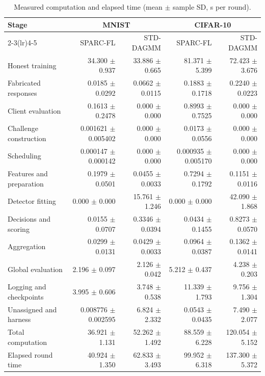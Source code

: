 \begin{table}[t]\centering\footnotesize\setlength{\tabcolsep}{5pt}
\caption{Measured computation and elapsed time (mean $\pm$ sample SD, s per round).}\label{tab:std-segments}
\begin{tabular}{lrrrr}\toprule
\multirow{2}{*}{Stage} & \multicolumn{2}{c}{MNIST} & \multicolumn{2}{c}{CIFAR-10} \\
\cmidrule(lr){2-3}\cmidrule(lr){4-5}
 & SPARC-FL & STD-DAGMM & SPARC-FL & STD-DAGMM \\ \midrule
Honest training & 34.300 $\pm$ 0.937 & 33.886 $\pm$ 0.665 & 81.371 $\pm$ 5.399 & 72.423 $\pm$ 3.676 \\
Fabricated responses & 0.0185 $\pm$ 0.0292 & 0.0662 $\pm$ 0.0115 & 0.1883 $\pm$ 0.1718 & 0.2240 $\pm$ 0.0223 \\
Client evaluation & 0.1613 $\pm$ 0.2478 & 0.000 $\pm$ 0.000 & 0.8993 $\pm$ 0.7525 & 0.000 $\pm$ 0.000 \\
Challenge construction & 0.001621 $\pm$ 0.005402 & 0.000 $\pm$ 0.000 & 0.0173 $\pm$ 0.0556 & 0.000 $\pm$ 0.000 \\
Scheduling & 0.000147 $\pm$ 0.000142 & 0.000 $\pm$ 0.000 & 0.000935 $\pm$ 0.005170 & 0.000 $\pm$ 0.000 \\
Features and preparation & 0.1979 $\pm$ 0.0501 & 0.0455 $\pm$ 0.0033 & 0.7294 $\pm$ 0.1792 & 0.1151 $\pm$ 0.0116 \\
Detector fitting & 0.000 $\pm$ 0.000 & 15.761 $\pm$ 1.246 & 0.000 $\pm$ 0.000 & 42.090 $\pm$ 1.868 \\
Decisions and scoring & 0.0155 $\pm$ 0.0707 & 0.3346 $\pm$ 0.0394 & 0.0434 $\pm$ 0.1455 & 0.8273 $\pm$ 0.0570 \\
Aggregation & 0.0299 $\pm$ 0.0131 & 0.0429 $\pm$ 0.0033 & 0.0964 $\pm$ 0.0387 & 0.1362 $\pm$ 0.0141 \\
Global evaluation & 2.196 $\pm$ 0.097 & 2.126 $\pm$ 0.042 & 5.212 $\pm$ 0.437 & 4.238 $\pm$ 0.203 \\
\midrule
Logging and checkpoints & 3.995 $\pm$ 0.606 & 3.748 $\pm$ 0.538 & 11.339 $\pm$ 1.793 & 9.756 $\pm$ 1.304 \\
Unassigned and harness & 0.008776 $\pm$ 0.002595 & 6.824 $\pm$ 2.332 & 0.0543 $\pm$ 0.0435 & 7.490 $\pm$ 2.077 \\
\midrule
Total computation & 36.921 $\pm$ 1.131 & 52.262 $\pm$ 1.492 & 88.559 $\pm$ 6.228 & 120.054 $\pm$ 5.152 \\
Elapsed round time & 40.924 $\pm$ 1.350 & 62.833 $\pm$ 3.493 & 99.952 $\pm$ 6.318 & 137.300 $\pm$ 5.372 \\
\bottomrule\end{tabular}\end{table}
